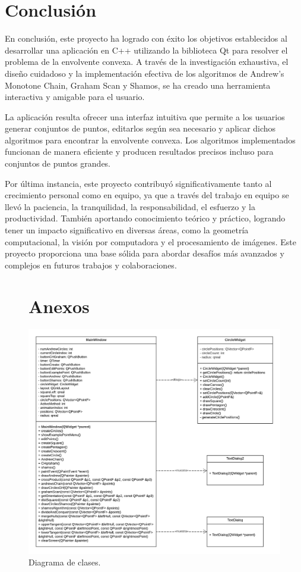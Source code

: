 \documentclass[conference]{IEEEtran}
\begin{document}
\section{Conclusión}

En conclusión, este proyecto ha logrado con éxito los objetivos establecidos al desarrollar una aplicación en C++ utilizando la biblioteca Qt para resolver el problema de la envolvente convexa. A través de la investigación exhaustiva, el diseño cuidadoso y la implementación efectiva de los algoritmos de Andrew's Monotone Chain, Graham Scan y Shamos, se ha creado una herramienta interactiva y amigable para el usuario.

La aplicación resulta ofrecer una interfaz intuitiva que permite a los usuarios generar conjuntos de puntos, editarlos según sea necesario y aplicar dichos algoritmos para encontrar la envolvente convexa. Los algoritmos implementados funcionan de manera eficiente y producen resultados precisos incluso para conjuntos de puntos grandes.

Por última instancia, este proyecto contribuyó significativamente tanto al crecimiento personal como en equipo, ya que a través del trabajo en equipo se llevó la paciencia, la tranquilidad, la responsabilidad, el esfuerzo y la productividad. También aportando conocimiento teórico y práctico, logrando tener un impacto significativo en diversas áreas, como la geometría computacional, la visión por computadora y el procesamiento de imágenes. Este proyecto proporciona una base sólida para abordar desafíos más avanzados y complejos en futuros trabajos y colaboraciones.


\printbibliography

\clearpage
\begin{figure}
\section{Anexos}
    \centering
    \includegraphics[width=\RelacionFiguradoscolumnas \linewidth]{images/Diagrama de clases.png}
    \caption{Diagrama de clases.}
    \label{fig:DiagramadeClases}
\end{figure}
\end{document}
